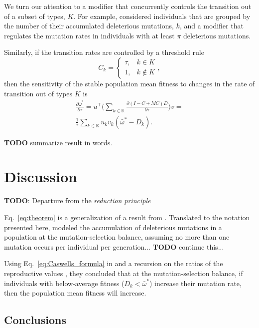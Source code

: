 \documentclass[9pt, a4paper, twocolumn]{extarticle}   	%
\newcommand*{\tr}{^\intercal}
\begin{document}
We turn our attention to a modifier that concurrently controls the transition out of a subset of types, $K$.
For example, \citet[Appendix~B]{Ram2012} considered individuals that are grouped by the number of their accumulated deleterious mutations, $k$, and a modifier that regulates the mutation rates in individuals with at least $\pi$ deleterious mutations.

Similarly, if the transition rates are controlled by a threshold rule 
\begin{equation}
C_k = \begin{cases}
\tau, & k \in K \\
1, & k \not\in K
\end{cases},
\end{equation}
then the sensitivity of the stable population mean fitness to changes in the
rate of transition out of types $K$ is
\begin{equation}
\begin{aligned}
\frac{\partial \bar{\omega}^*}{\partial \tau} = 
u\tr \Big( \sum_{k \in \mathbb{K{}}}{\frac{\partial (I - C + MC)D}{\partial \tau}} \Big) v = \\
\frac{1}{\tau} \sum_{k \in \mathbb{K}}{u_k v_k (\bar{\omega}^* - D_k)}.
\end{aligned}
\end{equation}

\textbf{TODO} summarize result in words.

\section*{Discussion}
\textbf{TODO}: Departure from the \emph{reduction principle}

Eq.~\ref{eq:theorem} is a generalization of a result from \citet[Eq.~4]{Ram2012}.
Translated to the notation presented here, \citeauthor{Ram2012} modeled the accumulation of deleterious mutations in a population at the mutation-selection balance, assuming no more than one mutation occurs per individual per generation... \textbf{TODO} continue this...

Using Eq.~\ref{eq:Caswells_formula} in  and a recursion on the ratios of the reproductive values \cite[see][eqs.~A5-6]{Ram2012}, they concluded that at the mutation-selection balance, if individuals with below-average fitness ($D_k < \bar{\omega}^*$) increase their mutation rate, then the population mean fitness will increase.

\subsection*{Conclusions}
\end{document}
